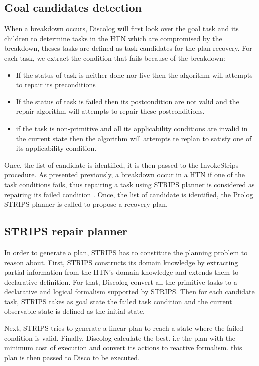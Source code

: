 \subsection{Goal candidates detection}
When a breakdown occurs, Discolog  will  first look over the goal task and its children to determine tasks in the HTN which are compromised by the breakdown, theses tasks are defined as task candidates for the plan recovery. 
For each task, we extract the condition that fails because of the breakdown: 
\begin{itemize}
	\item	If the status of task is neither done nor live then the algorithm will attempts to repair its preconditions
	\item	If the status of task is failed then its postcondition are not valid and the repair algorithm will attempts to repair these postconditions.
	\item	if the task is non-primitive and all its applicability conditions are invalid in the current state then the algorithm will attempts te replan to satisfy one of its applicability condition. 
\end{itemize}

Once, the list of candidate is identified, it is then passed to the InvokeStrips procedure.
As presented previously, a breakdown occur in a HTN if one of the task conditions fails, thus repairing a task using STRIPS planner is considered as repairing its failed condition .
Once, the list of candidate is identified, the Prolog STRIPS planner is called to propose a recovery plan.
\subsection{STRIPS repair planner}
In order to generate a plan, STRIPS has to constitute the planning problem to reason about. First,  STRIPS constructs its domain knowledge by extracting partial information from the HTN's domain knowledge and extends them to declarative definition. For that, Discolog convert all the primitive tasks to a declarative and logical formalism supported by STRIPS. Then for each candidate task, STRIPS takes as goal state  the failed task condition and the current observable state is defined as the initial state.

Next, STRIPS tries to generate a linear plan to reach a state where the failed condition is valid. Finally, Discolog calculate the best. i.e  the plan with the minimum cost of execution and convert its actions to reactive formalism. this plan is then passed to Disco to be executed.


